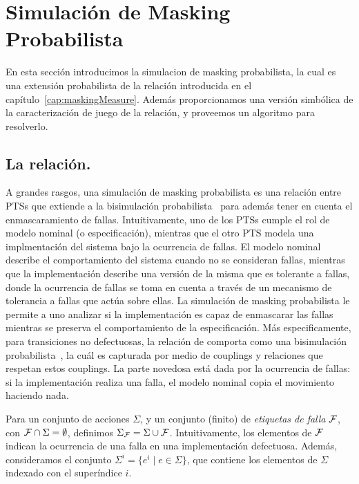 \section{Simulación de Masking Probabilista} \label{sec:mask_dist_prob}

En esta sección introducimos la simulacion de masking probabilista, la cual es una extensión probabilista de la relación introducida en el capítulo~\ref{cap:maskingMeasure}. Además proporcionamos una versión simbólica de la caracterización de juego de la relación, y proveemos un algoritmo para resolverlo.

\subsection{La relación.}%
%
A grandes rasgos, una simulación de masking probabilista es una relación entre PTSs que extiende a la bisimulación probabilista~\cite{Larsen91}
para además tener en cuenta el enmascaramiento de fallas.  Intuitivamente, uno de los PTSs
cumple el rol de modelo nominal (o especificación), mientras que el otro PTS modela una implmentación del sistema bajo la ocurrencia de fallas. El modelo nominal describe el comportamiento del sistema cuando no se consideran fallas, mientras que la implementación describe una versión de la misma que es tolerante a fallas, donde la ocurrencia de fallas se toma en cuenta a través de un mecanismo de tolerancia a fallas que actúa sobre ellas.  La simulación de masking probabilista le permite a uno analizar si la implementación es capaz de enmascarar las fallas mientras se preserva el comportamiento de la especificación. Más especificamente, para transiciones no defectuosas, la relación de comporta como una bisimulación probabilista~\cite{Larsen91}, la cuál es capturada por medio de couplings y relaciones que respetan estos couplings. %
La parte novedosa está dada por la ocurrencia de fallas: si la implementación realiza una falla, el modelo nominal copia el movimiento haciendo nada.

Para un conjunto de acciones $\Sigma$, y un conjunto (finito) de \emph{etiquetas de falla} $\mathcal{F}$, con $\mathcal{F}\cap\Sigma=\emptyset$, definimos $\Sigma_{\mathcal{F}}
= \Sigma \cup \mathcal{F}$.  Intuitivamente, los elementos de $\mathcal{F}$
indican la ocurrencia de una falla en una implementación defectuosa.
Además, consideramos el conjunto $\Sigma^i = \{ e^i
\mid e \in \Sigma\}$, que contiene los elementos de 
 $\Sigma$ indexado con el superíndice $i$.

